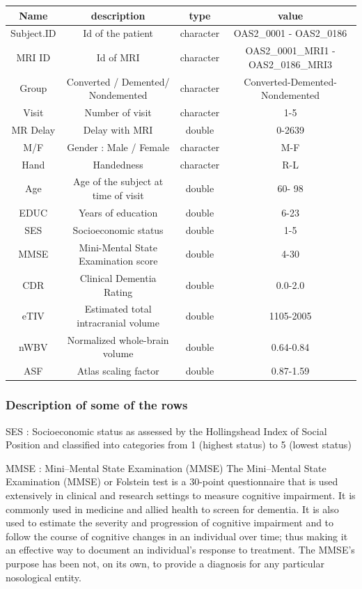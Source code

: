 \documentclass[
]{article}
\begin{document}
\begin{longtable}[]{@{}cccc@{}}
\toprule()
Name & description & type & value \\
\midrule()
\endhead
Subject.ID & Id of the patient & character & OAS2\_0001 - OAS2\_0186 \\
MRI ID & Id of MRI & character & OAS2\_0001\_MRI1 - OAS2\_0186\_MRI3 \\
Group & Converted / Demented/ Nondemented & character &
Converted-Demented-Nondemented \\
Visit & Number of visit & character & 1-5 \\
MR Delay & Delay with MRI & double & 0-2639 \\
M/F & Gender : Male / Female & character & M-F \\
Hand & Handedness & character & R-L \\
Age & Age of the subject at time of visit & double & 60- 98 \\
EDUC & Years of education & double & 6-23 \\
SES & Socioeconomic status & double & 1-5 \\
MMSE & Mini-Mental State Examination score & double & 4-30 \\
CDR & Clinical Dementia Rating & double & 0.0-2.0 \\
eTIV & Estimated total intracranial volume & double & 1105-2005 \\
nWBV & Normalized whole-brain volume & double & 0.64-0.84 \\
ASF & Atlas scaling factor & double & 0.87-1.59 \\
\bottomrule()
\end{longtable}

\hypertarget{description-of-some-of-the-rows}{%
\subsubsection{Description of some of the
rows}\label{description-of-some-of-the-rows}}

SES : Socioeconomic status as assessed by the Hollingshead Index of
Social Position and classified into categories from 1 (highest status)
to 5 (lowest status)

MMSE : Mini--Mental State Examination (MMSE) The Mini--Mental State
Examination (MMSE) or Folstein test is a 30-point questionnaire that is
used extensively in clinical and research settings to measure cognitive
impairment. It is commonly used in medicine and allied health to screen
for dementia. It is also used to estimate the severity and progression
of cognitive impairment and to follow the course of cognitive changes in
an individual over time; thus making it an effective way to document an
individual's response to treatment. The MMSE's purpose has been not, on
its own, to provide a diagnosis for any particular nosological entity.
\end{document}
